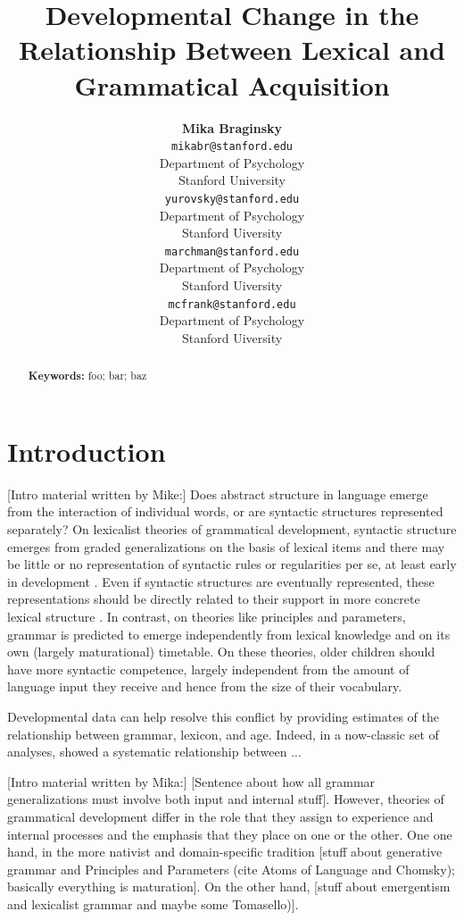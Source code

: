 \documentclass[10pt,letterpaper]{article}
\title{Developmental Change in the Relationship Between Lexical and Grammatical Acquisition}
\author{{\large \bf Mika Braginsky} \\
  \texttt{mikabr@stanford.edu} \\
  Department of Psychology \\
  Stanford University
  \And {\large \bf Daniel Yurovsky} \\
  \texttt{yurovsky@stanford.edu} \\
  Department of Psychology \\
  Stanford Uiversity
    \And {\large \bf Virginia Marchman} \\
    \texttt{marchman@stanford.edu} \\
  Department of Psychology \\
  Stanford Uiversity
    \And {\large \bf Michael C. Frank}\\
    \texttt{mcfrank@stanford.edu} \\
  Department of Psychology \\
  Stanford Uiversity}
\begin{document}
\maketitle

\begin{abstract}
\lipsum[1]

\textbf{Keywords:} 
foo; bar; baz
\end{abstract}

\section{Introduction}

[Intro material written by Mike:]
Does abstract structure in language emerge from the interaction of individual words, or are syntactic structures represented separately? On lexicalist theories of grammatical development, syntactic structure emerges from graded generalizations on the basis of lexical items and there may be little or no representation of syntactic rules or regularities per se, at least early in development \cite{tomasello2001,tomasello2003}. Even if syntactic structures are eventually represented, these representations should be directly related to their support in more concrete lexical structure \cite{bannard2009,bod2010}. In contrast, on theories like principles and parameters, grammar is predicted to emerge independently from lexical knowledge and on its own (largely maturational) timetable. On these theories, older children should have more syntactic competence, largely independent from the amount of language input they receive and hence from the size of their vocabulary.

Developmental data can help resolve this conflict by providing estimates of the relationship between grammar, lexicon, and age. Indeed, in a now-classic set of analyses, \cite{bates1994} showed a systematic relationship between ...

[Intro material written by Mika:]
[Sentence about how all grammar generalizations must involve both input and internal stuff]. However, theories of grammatical development differ in the role that they assign to experience and internal processes and the emphasis that they place on one or the other. One one hand, in the more nativist and domain-specific tradition [stuff about generative grammar and Principles and Parameters (cite Atoms of Language and Chomsky); basically everything is maturation]. On the other hand, [stuff about emergentism and lexicalist grammar \cite{bates1999} and maybe some Tomasello)].
\end{document}
